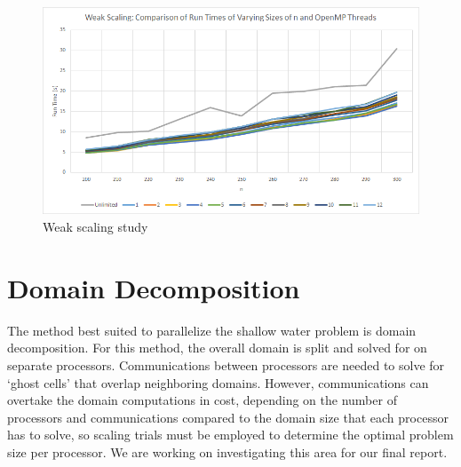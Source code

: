 \documentclass{article}
\begin{document}
\begin{figure}[here]
  \centering
  \includegraphics[width=0.8\linewidth]{weak-scaling.png}
  \caption{Weak scaling study}
  \label{fig4}
\end{figure}

\section*{Domain Decomposition}
The method best suited to parallelize the shallow water problem is domain decomposition. For this method, the overall domain is split and solved for on separate processors. Communications between processors are needed to solve for `ghost cells' that overlap neighboring domains. However, communications can overtake the domain computations in cost, depending on the number of processors and communications compared to the domain size that each processor has to solve, so scaling trials must be employed to determine the optimal problem size per processor. We are working on investigating this area for our final report.
\end{document}
